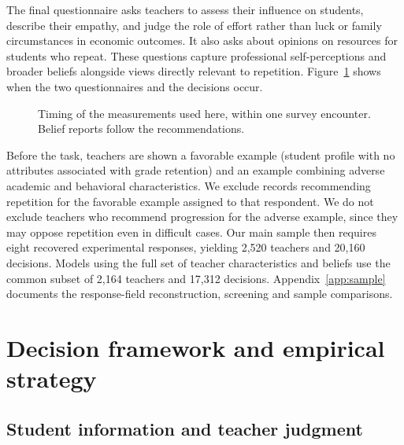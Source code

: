The final questionnaire asks teachers to assess their influence on students, describe their empathy, and judge the role of effort rather than luck or family circumstances in economic outcomes. It also asks about opinions on resources for students who repeat. These questions capture professional self-perceptions and broader beliefs alongside views directly relevant to repetition. Figure~\ref{fig:timeline} shows when the two questionnaires and the decisions occur.

\begin{figure}[!htbp]\centering\color{reused}
\caption{Timing of the measurements used here, within one survey encounter. Belief reports follow the recommendations.}\label{fig:timeline}
\end{figure}
Before the task, teachers are shown a favorable example (student profile with no attributes associated with grade retention) and an example combining adverse academic and behavioral characteristics. We exclude records recommending repetition for the favorable example assigned to that respondent. We do not exclude teachers who recommend progression for the adverse example, since they may oppose repetition even in difficult cases. Our main sample then requires eight recovered experimental responses, yielding 2,520 teachers and 20,160 decisions. Models using the full set of teacher characteristics and beliefs use the common subset of 2,164 teachers and 17,312 decisions. Appendix~\ref{app:sample} documents the response-field reconstruction, screening and sample comparisons.

\section{Decision framework and empirical strategy}\label{sec:strategy}
\subsection{Student information and teacher judgment}


